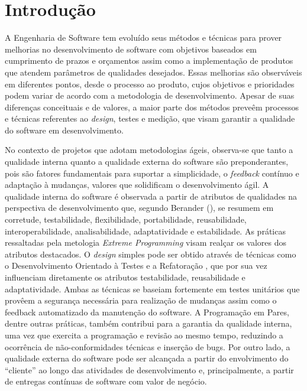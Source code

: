 \chapter{Introdução}
\label{cap-introducao}

A Engenharia de Software tem evoluído seus métodos e técnicas para prover melhorias no desenvolvimento de software com objetivos baseados em cumprimento de prazos e orçamentos assim como a implementação de produtos que atendem parâmetros de qualidades desejados. Essas melhorias são observáveis em diferentes pontos, desde o processo ao produto, cujos objetivos e prioridades podem variar de acordo com a metodologia de desenvolvimento.
%
Apesar de suas diferenças conceituais e de valores, a maior parte dos métodos preveêm processos e técnicas referentes ao \emph{design}, testes e medição, que visam garantir a qualidade do software em desenvolvimento.


No contexto de projetos que adotam metodologias ágeis, observa-se que tanto a qualidade interna quanto a qualidade externa do software são preponderantes, pois são fatores fundamentais para suportar a simplicidade, o \emph{feedback} contínuo e adaptação à mudanças, valores que solidificam o desenvolvimento ágil.
%
A qualidade interna do software é observada a partir de atributos de qualidades na perspectiva de desenvolvimento que, segundo Berander (\citeyear{berander2005}), se resumem em corretude, testabilidade, flexibilidade, portabilidade, reusabilidade, interoperabilidade, analisabilidade, adaptatividade e estabilidade. As práticas ressaltadas pela metologia \emph{Extreme Programming} \cite{beck2000} visam realçar os valores dos atributos destacados.
%
O \emph{design} simples pode ser obtido através de técnicas como o Desenvolvimento Orientado à Testes \cite{beck2002} e a Refatoração \cite{fowler1999}, que por sua vez influenciam diretamente os atributos testabilidade, reusabilidade e adaptatividade. Ambas as técnicas se baseiam fortemente em testes unitários que provêem a segurança necessária para realização de mudanças assim como o feedback automatizado da manutenção do software.
%
A Programação em Pares, dentre outras práticas, também contribui para a garantia da qualidade interna, uma vez que exercita a programação e revisão ao mesmo tempo, reduzindo a ocorrência de não-conformidades técnicas e inserção de bugs. Por outro lado, a qualidade externa do software pode ser alcançada a partir do envolvimento do ``cliente'' ao longo das atividades de desenvolvimento e, principalmente, a partir de entregas contínuas de software com valor de negócio.


